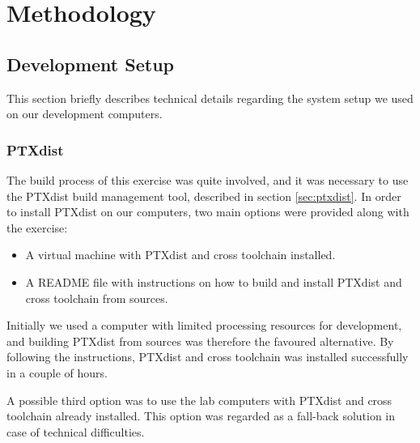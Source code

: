 \chapter{Methodology}

\section{Development Setup}
This section briefly describes technical details regarding the system setup we used on our development computers.

\subsection{PTXdist}
The build process of this exercise was quite involved, and it was necessary to use the PTXdist build management tool, described in section \ref{sec:ptxdist}. In order to install PTXdist on our computers, two main options were provided along with the exercise:
\begin{itemize}
  \item A virtual machine with PTXdist and cross toolchain installed.
  \item A README file with instructions on how to build and install PTXdist and cross toolchain from sources.
\end{itemize}

Initially we used a computer with limited processing resources for development, and building PTXdist from sources was therefore the favoured alternative. By following the instructions, PTXdist and cross toolchain was installed successfully in a couple of hours.

A possible third option was to use the lab computers with PTXdist and cross toolchain already installed. This option was regarded as a fall-back solution in case of technical difficulties.

